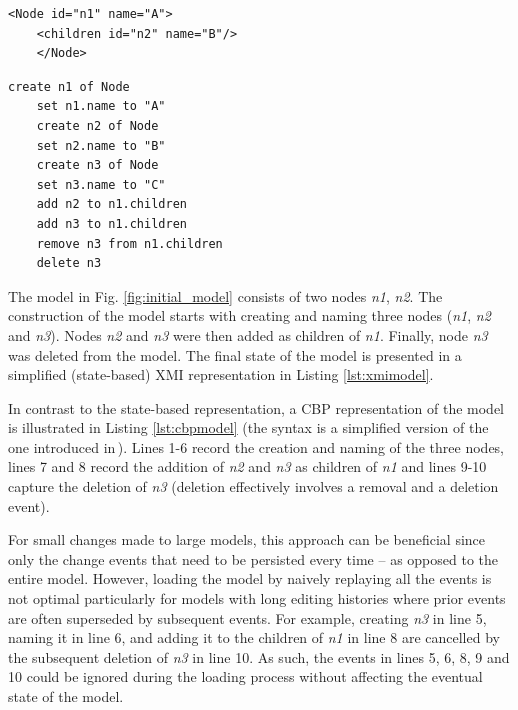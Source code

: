 \documentclass[12pt, a4paper]{report} \usepackage[titletoc]{appendix}
\begin{document}
\noindent
\begin{minipage}[t]{0.5\linewidth}
	\begin{lstlisting}[style=xmi,caption={State-based representation of the tree model in (simplified) XMI.},label=lst:xmimodel]
	<Node id="n1" name="A">
	<children id="n2" name="B"/>
	</Node>
	\end{lstlisting}
\end{minipage}
\hfill
\begin{minipage}[t]{0.5\linewidth}
	\begin{lstlisting}[style=eol,caption={Change-based representation of the tree model.},label=lst:cbpmodel]
	create n1 of Node
	set n1.name to "A"      
	create n2 of Node
	set n2.name to "B"      
	create n3 of Node
	set n3.name to "C"      
	add n2 to n1.children   
	add n3 to n1.children
	remove n3 from n1.children   
	delete n3
	\end{lstlisting}
\end{minipage}

The model in Fig. \ref{fig:initial_model} consists of two nodes \emph{n1}, \emph{n2}.
The construction of the model starts with creating and naming three nodes (\emph{n1}, \emph{n2} and \emph{n3}).
Nodes \emph{n2} and \emph{n3} were then added as children of \emph{n1}.
Finally, node \emph{n3} was deleted from the model.
The final state of the model is presented in a simplified (state-based) XMI representation in Listing \ref{lst:xmimodel}.

In contrast to the state-based representation, a CBP representation of the model is illustrated in Listing \ref{lst:cbpmodel} (the syntax is a simplified version of the one introduced in\,\cite{yohannis2017turning}).
Lines 1-6 record the creation and naming of the three nodes, lines 7 and 8 record the addition of \emph{n2} and \emph{n3} as children of \emph{n1} and lines 9-10 capture the deletion of \emph{n3} (deletion effectively involves a removal and a deletion event).

For small changes made to large models, this approach can be beneficial since only the change events that need to be persisted every time -- as opposed to the entire model. However, loading the model by naively replaying all the events is not optimal particularly for models with long editing histories where prior events are often superseded by subsequent events. For example, creating \emph{n3} in line 5, naming it in line 6, and adding it to the children of \emph{n1} in line 8 are cancelled by the subsequent deletion of \emph{n3} in line 10. As such, the events in lines 5, 6, 8, 9 and 10 could be ignored during the loading process without affecting the eventual state of the model.
\end{document}
